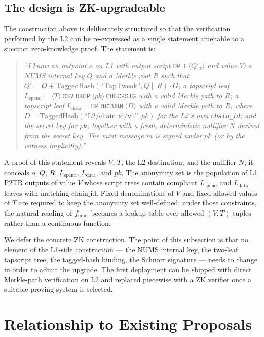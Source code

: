 \documentclass[11pt,a4paper]{article}
\newcommand{\fmint}{f_{\mathrm{mint}}}
\begin{document}
\subsection{The design is ZK-upgradeable}
\label{sec:zkupgrade}

The construction above is deliberately structured so that the verification performed by the L2 can be re-expressed as a single statement amenable to a succinct zero-knowledge proof. The statement is:

\begin{quote}\itshape
``I know an outpoint $o$ on L1 with output script $\texttt{OP\_1}\ \langle Q'_x\rangle$ and value $V$; a NUMS internal key $Q$ and a Merkle root $R$ such that $Q' = Q + \mathrm{TaggedHash}(\text{``TapTweak''}, Q\|R)\cdot G$; a tapscript leaf $L_{\mathrm{spend}} = \langle T\rangle\ \texttt{CSV}\ \texttt{DROP}\ \langle pk\rangle\ \texttt{CHECKSIG}$ with a valid Merkle path to $R$; a tapscript leaf $L_{\mathrm{data}} = \texttt{OP\_RETURN}\ \langle D\rangle$ with a valid Merkle path to $R$, where $D = \mathrm{TaggedHash}(\text{``L2/chain\_id/v1''}, pk)$ for the L2's own \texttt{chain\_id}; and the secret key for $pk$; together with a fresh, deterministic nullifier $N$ derived from the secret key. The mint message $m$ is signed under $pk$ (or by the witness implicitly).''
\end{quote}

A proof of this statement reveals $V$, $T$, the L2 destination, and the nullifier $N$; it conceals $o$, $Q$, $R$, $L_{\mathrm{spend}}$, $L_{\mathrm{data}}$, and $pk$. The anonymity set is the population of L1 P2TR outputs of value $V$ whose script trees contain compliant $L_{\mathrm{spend}}$ and $L_{\mathrm{data}}$ leaves with matching $\mathrm{chain\_id}$. Fixed denominations of $V$ and fixed allowed values of $T$ are required to keep the anonymity set well-defined; under those constraints, the natural reading of $\fmint$ becomes a lookup table over allowed $(V, T)$ tuples rather than a continuous function.

We defer the concrete ZK construction. The point of this subsection is that no element of the L1-side construction --- the NUMS internal key, the two-leaf tapscript tree, the tagged-hash binding, the Schnorr signature --- needs to change in order to admit the upgrade. The first deployment can be shipped with direct Merkle-path verification on L2 and replaced piecewise with a ZK verifier once a suitable proving system is selected.

\iffalse
\section{Relationship to Existing Proposals}
\end{document}
